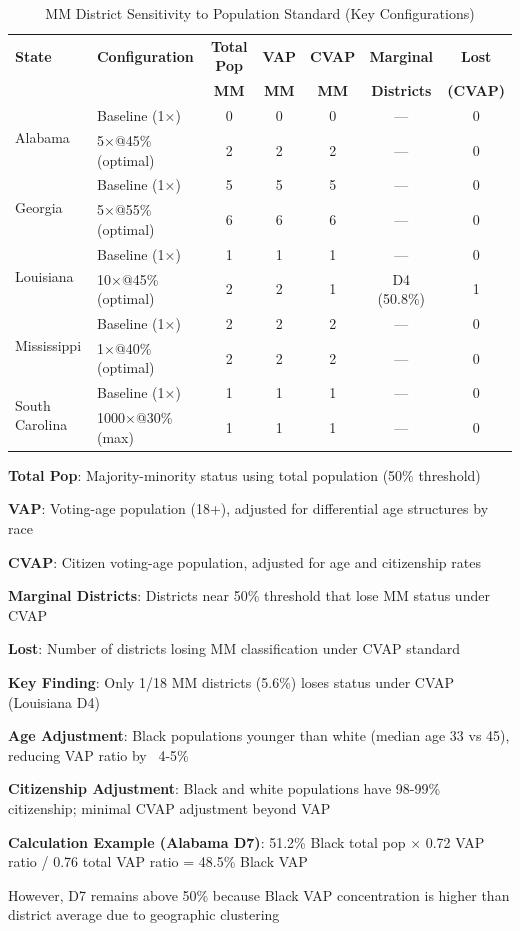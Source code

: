 \begin{table}[H]
\centering
\caption{MM District Sensitivity to Population Standard (Key Configurations)}
\label{tab:cvap_sensitivity}
\begin{tabular}{llccccc}
\toprule
\textbf{State} & \textbf{Configuration} & \textbf{Total Pop} & \textbf{VAP} & \textbf{CVAP} & \textbf{Marginal} & \textbf{Lost} \\
& & \textbf{MM} & \textbf{MM} & \textbf{MM} & \textbf{Districts} & \textbf{(CVAP)} \\
\midrule
\multirow{2}{*}{Alabama} & Baseline (1×) & 0 & 0 & 0 & --- & 0 \\
& 5×@45\% (optimal) & 2 & 2 & 2 & --- & 0 \\
\midrule
\multirow{2}{*}{Georgia} & Baseline (1×) & 5 & 5 & 5 & --- & 0 \\
& 5×@55\% (optimal) & 6 & 6 & 6 & --- & 0 \\
\midrule
\multirow{2}{*}{Louisiana} & Baseline (1×) & 1 & 1 & 1 & --- & 0 \\
& 10×@45\% (optimal) & 2 & 2 & 1 & D4 (50.8\%) & 1 \\
\midrule
\multirow{2}{*}{Mississippi} & Baseline (1×) & 2 & 2 & 2 & --- & 0 \\
& 1×@40\% (optimal) & 2 & 2 & 2 & --- & 0 \\
\midrule
\multirow{2}{*}{South Carolina} & Baseline (1×) & 1 & 1 & 1 & --- & 0 \\
& 1000×@30\% (max) & 1 & 1 & 1 & --- & 0 \\
\bottomrule
\end{tabular}
\begin{tablenotes}
\small
\item \textbf{Total Pop}: Majority-minority status using total population (50\% threshold)
\item \textbf{VAP}: Voting-age population (18+), adjusted for differential age structures by race
\item \textbf{CVAP}: Citizen voting-age population, adjusted for age and citizenship rates
\item \textbf{Marginal Districts}: Districts near 50\% threshold that lose MM status under CVAP
\item \textbf{Lost}: Number of districts losing MM classification under CVAP standard
\item \textbf{Key Finding}: Only 1/18 MM districts (5.6\%) loses status under CVAP (Louisiana D4)
\item \textbf{Age Adjustment}: Black populations younger than white (median age 33 vs 45), reducing VAP ratio by ~4-5\%
\item \textbf{Citizenship Adjustment}: Black and white populations have 98-99\% citizenship; minimal CVAP adjustment beyond VAP
\item \textbf{Calculation Example (Alabama D7)}: 51.2\% Black total pop $\times$ 0.72 VAP ratio / 0.76 total VAP ratio = 48.5\% Black VAP
\item However, D7 remains above 50\% because Black VAP concentration is higher than district average due to geographic clustering
\end{tablenotes}
\end{table}


